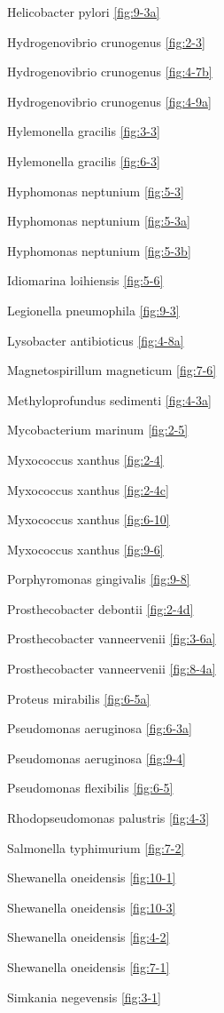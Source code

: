\documentclass[]{tufte-book}
\begin{document}
Helicobacter pylori \ref{fig:9-3a}

Hydrogenovibrio crunogenus \ref{fig:2-3}

Hydrogenovibrio crunogenus \ref{fig:4-7b}

Hydrogenovibrio crunogenus \ref{fig:4-9a}

Hylemonella gracilis \ref{fig:3-3}

Hylemonella gracilis \ref{fig:6-3}

Hyphomonas neptunium \ref{fig:5-3}

Hyphomonas neptunium \ref{fig:5-3a}

Hyphomonas neptunium \ref{fig:5-3b}

Idiomarina loihiensis \ref{fig:5-6}

Legionella pneumophila \ref{fig:9-3}

Lysobacter antibioticus \ref{fig:4-8a}

Magnetospirillum magneticum \ref{fig:7-6}

Methyloprofundus sedimenti \ref{fig:4-3a}

Mycobacterium marinum \ref{fig:2-5}

Myxococcus xanthus \ref{fig:2-4}

Myxococcus xanthus \ref{fig:2-4c}

Myxococcus xanthus \ref{fig:6-10}

Myxococcus xanthus \ref{fig:9-6}

Porphyromonas gingivalis \ref{fig:9-8}

Prosthecobacter debontii \ref{fig:2-4d}

Prosthecobacter vanneervenii \ref{fig:3-6a}

Prosthecobacter vanneervenii \ref{fig:8-4a}

Proteus mirabilis \ref{fig:6-5a}

Pseudomonas aeruginosa \ref{fig:6-3a}

Pseudomonas aeruginosa \ref{fig:9-4}

Pseudomonas flexibilis \ref{fig:6-5}

Rhodopseudomonas palustris \ref{fig:4-3}

Salmonella typhimurium \ref{fig:7-2}

Shewanella oneidensis \ref{fig:10-1}

Shewanella oneidensis \ref{fig:10-3}

Shewanella oneidensis \ref{fig:4-2}

Shewanella oneidensis \ref{fig:7-1}

Simkania negevensis \ref{fig:3-1}
\end{document}
